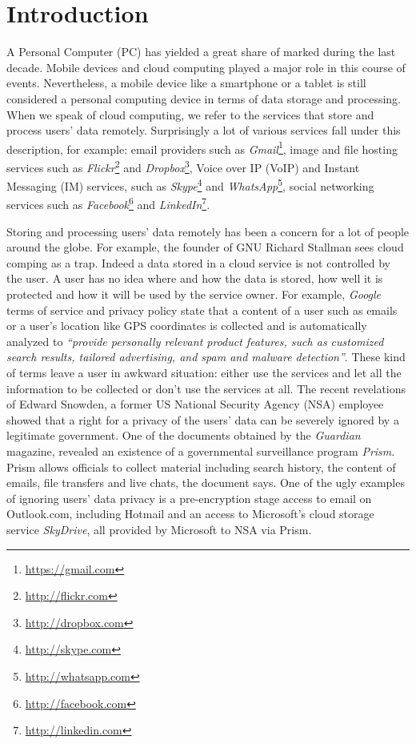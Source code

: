 \section{Introduction}

A Personal Computer (PC) has yielded a great share of marked during the
last decade. Mobile devices and cloud computing played a major role in
this course of events. Nevertheless, a mobile device like a smartphone or a
tablet is still considered a personal computing device in terms of data
storage and processing. When we speak of cloud computing, we refer to
the services that store and process users' data remotely.
Surprisingly a lot of various services fall under this description,
for example: email providers such as
\emph{Gmail}\footnote{\url{https://gmail.com}},
image and file hosting services such as
\emph{Flickr}\footnote{\url{http://flickr.com}} and
\emph{Dropbox}\footnote{\url{http://dropbox.com}},
Voice over IP (VoIP) and Instant Messaging (IM) services, such as
\emph{Skype}\footnote{\url{http://skype.com}} and
\emph{WhatsApp}\footnote{\url{http://whatsapp.com}},
social networking services such as
\emph{Facebook}\footnote{\url{http://facebook.com}} and
\emph{LinkedIn}\footnote{\url{http://linkedin.com}}.

Storing and processing users' data remotely has been a concern for
a lot of people around the globe. For example, the founder of GNU
Richard Stallman sees cloud comping as a trap\cite{stallman-cloud-08}.
Indeed a data stored in a cloud service is not controlled by the user.
A user has no idea where and how the data is stored, how well it is
protected and how it will be used by the service owner.
For example, \emph{Google} terms of service\cite{google-tos} and
privacy policy\cite{google-privacy} state that a content of a user
such as emails or a user's location like GPS coordinates is collected
and is automatically analyzed to
\emph{``provide personally relevant product
features, such as customized search results, tailored advertising,
and spam and malware detection''}.
These kind of terms leave a user
in awkward situation: either use the services and let all the information
to be collected or don't use the services at all.
The recent revelations\cite{snowden-timeline}
of Edward Snowden, a former US National Security Agency (NSA) employee
showed that a right for a privacy of the users' data can be
severely ignored by a legitimate government.
One of the documents obtained by the \emph{Guardian} magazine,
revealed an existence of a governmental surveillance program
\emph{Prism}\cite{snowden-prism}. Prism allows officials to collect
material including search history, the content of emails, file
transfers and live chats, the document says. One of the ugly examples
of ignoring users' data privacy is a pre-encryption stage access
to email on Outlook.com, including Hotmail and an access to Microsoft's
cloud storage service \emph{SkyDrive}, all provided by Microsoft to NSA
via Prism\cite{snowden-ms-nsa}.

